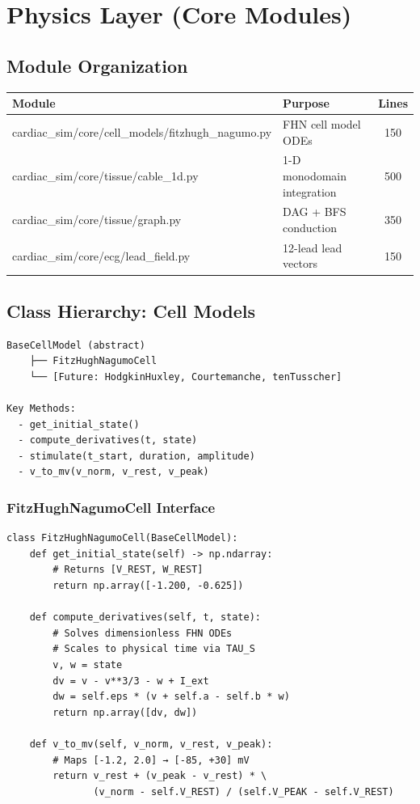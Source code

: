 \documentclass[11pt, a4paper]{article}
\begin{document}
\section{Physics Layer (Core Modules)}

\subsection{Module Organization}

\begin{tabularx}{\textwidth}{|l|X|c|}
\hline
\textbf{Module} & \textbf{Purpose} & \textbf{Lines} \\
\hline
cardiac\_sim/core/cell\_models/fitzhugh\_nagumo.py & FHN cell model ODEs & 150 \\
cardiac\_sim/core/tissue/cable\_1d.py & 1-D monodomain integration & 500 \\
cardiac\_sim/core/tissue/graph.py & DAG + BFS conduction & 350 \\
cardiac\_sim/core/ecg/lead\_field.py & 12-lead lead vectors & 150 \\
\hline
\end{tabularx}

\subsection{Class Hierarchy: Cell Models}

\begin{verbatim}
BaseCellModel (abstract)
    ├── FitzHughNagumoCell
    └── [Future: HodgkinHuxley, Courtemanche, tenTusscher]

Key Methods:
  - get_initial_state()
  - compute_derivatives(t, state)
  - stimulate(t_start, duration, amplitude)
  - v_to_mv(v_norm, v_rest, v_peak)
\end{verbatim}

\subsubsection{FitzHughNagumoCell Interface}

\begin{lstlisting}
class FitzHughNagumoCell(BaseCellModel):
    def get_initial_state(self) -> np.ndarray:
        # Returns [V_REST, W_REST]
        return np.array([-1.200, -0.625])
    
    def compute_derivatives(self, t, state):
        # Solves dimensionless FHN ODEs
        # Scales to physical time via TAU_S
        v, w = state
        dv = v - v**3/3 - w + I_ext
        dw = self.eps * (v + self.a - self.b * w)
        return np.array([dv, dw])
    
    def v_to_mv(self, v_norm, v_rest, v_peak):
        # Maps [-1.2, 2.0] → [-85, +30] mV
        return v_rest + (v_peak - v_rest) * \
               (v_norm - self.V_REST) / (self.V_PEAK - self.V_REST)
\end{lstlisting}
\end{document}
